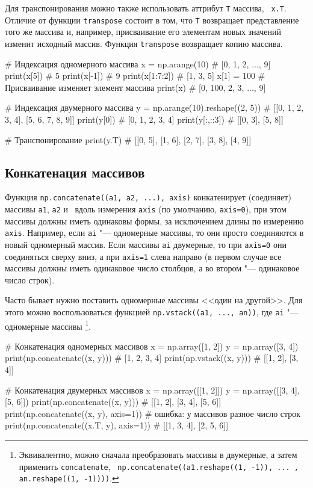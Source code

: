 Для транспонирования можно также использовать аттрибут \verb"T" массива, \te\ \verb"x.T".
Отличие от функции \verb"transpose" состоит в том, что \verb"T" возвращает представление того же массива и, например, присваивание его элементам новых значений изменит исходный массив.
Функция \verb"transpose" возвращает копию массива.

\begin{python}
# Индексация одномерного массива
x = np.arange(10)                     # [0, 1, 2, ..., 9]
print(x[5])                           # 5
print(x[-1])                          # 9
print(x[1:7:2])                       # [1, 3, 5]
x[1] = 100                            # Присваивание изменяет элемент массива
print(x)                              # [0, 100, 2, 3, ..., 9]

# Индексация двумерного массива
y = np.arange(10).reshape((2, 5))     # [[0, 1, 2, 3, 4], [5, 6, 7, 8, 9]]
print(y[0])                           # [0, 1, 2, 3, 4]
print(y[:,::3])                       # [[0, 3], [5, 8]] 

# Транспонирование
print(y.T)                            # [[0, 5], [1, 6], [2, 7], [3, 8], [4, 9]]
\end{python}


\subsection{Конкатенация массивов}
Функция \verb"np.concatenate((a1, a2, ...), axis)" конкатенирует (соединяет) массивы \verb"a1", \verb"a2" и \td\ вдоль измерения \verb"axis" (по умолчанию, \verb"axis=0"), при этом массивы должны иметь одинаковы формы, за исключением длины по измерению \verb"axis".
Например, если \verb"ai" "--- одномерные массивы, то они просто соединяются в новый одномерный массив.
Если массивы \verb"ai" двумерные, то при \verb"axis=0" они соединяться сверху вниз, а при \verb"axis=1" слева направо (в первом случае все массивы должны иметь одинаковое число столбцов, а во втором "--- одинаковое число строк).

Часто бывает нужно поставить одномерные массивы <<один на другой>>.
Для этого можно воспользоваться функцией \verb"np.vstack((a1, ..., an))", где \verb"ai" "--- одномерные массивы%
\footnote{Эквивалентно, можно сначала преобразовать массивы в двумерные, а затем применить \verb"concatenate", \te\ \verb"np.concatenate((a1.reshape((1, -1)), ... , an.reshape((1, -1))))".}.

\begin{python}
# Конкатенация одномерных массивов
x = np.array([1, 2])
y = np.array([3, 4])
print(np.concatenate((x, y)))  # [1, 2, 3, 4]
print(np.vstack((x, y)))       # [[1, 2], [3, 4]]

# Конкатенация двумерных массивов
x = np.array([[1, 2]])
y = np.array([[3, 4], [5, 6]])
print(np.concatenate((x, y)))            # [[1, 2], [3, 4], [5, 6]]
print(np.concatenate((x, y), axis=1))    # ошибка: у массивов разное число строк
print(np.concatenate((x.T, y), axis=1))  # [[1, 3, 4], [2, 5, 6]]
\end{python}


